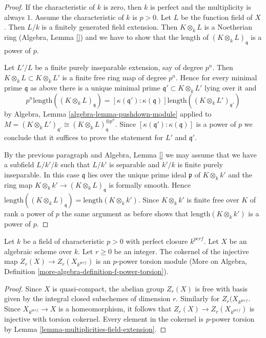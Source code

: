 \begin{proof}
If the characteristic of $k$ is zero, then $k$ is perfect and
the multiplicity is always $1$. Assume the characteristic of $k$ is $p > 0$.
Let $L$ be the function field of $X$. Then $L/k$ is a finitely generated
field extension. Then $K \otimes_k L$ is a Noetherian ring
(Algebra, Lemma \ref{}) and we
have to show that the length of $(K \otimes_k L)_\mathfrak q$
is a power of $p$.

\medskip\noindent
Let $L'/L$ be a finite purely inseparable extension, say of degree
$p^n$. Then $K \otimes_k L \subset K \otimes_k L'$ is a finite
free ring map of degree $p^n$. Hence for every minimal
prime $\mathfrak q$ as above there is a unique minimal prime
$\mathfrak q' \subset K \otimes_k L'$ lying over it and
$$
p^n \text{length}((K \otimes_k L)_\mathfrak q) =
[\kappa(\mathfrak q') : \kappa(\mathfrak q)]
\text{length}((K \otimes_k L')_{\mathfrak q'})
$$
by Algebra, Lemma \ref{algebra-lemma-pushdown-module} applied
to $M = (K \otimes_k L')_{\mathfrak q'} \cong
(K \otimes_k L)_{\mathfrak q}^{\oplus p^n}$.
Since $[\kappa(\mathfrak q') : \kappa(\mathfrak q)]$ is a power
of $p$ we conclude that it suffices to prove the
statement for $L'$ and $\mathfrak q'$.

\medskip\noindent
By the previous paragraph and Algebra, Lemma \ref{}
we may assume that we have a subfield $L/k'/k$
such that $L/k'$ is separable and $k'/k$ is finite
purely inseparable. In this case $\mathfrak q$ lies
over the unique prime ideal $\mathfrak p$ of $K \otimes_k k'$
and the ring map $K \otimes_k k' \to (K \otimes_k L)_\mathfrak q$
is formally smooth. Hence
$\text{length}((K \otimes_k L)_\mathfrak q) =
\text{length}(K \otimes_k k')$.
Since $K \otimes_k k'$ is finite free over $K$ of
rank a power of $p$ the same argument as before shows
that $\text{length}(K \otimes_k k')$ is a power of $p$.
\end{proof}

\begin{lemma}
\label{lemma-how-different}
Let $k$ be a field of characteristic $p > 0$ with perfect closure $k^{perf}$.
Let $X$ be an algebraic scheme over $k$. Let $r \geq 0$ be an integer.
The cokernel of the injective map $Z_r(X) \to Z_r(X_{k^{perf}})$ is an
$p$-power torsion module (More on Algebra, Definition
\ref{more-algebra-definition-f-power-torsion}).
\end{lemma}

\begin{proof}
Since $X$ is quasi-compact, the abelian group $Z_r(X)$ is free with basis
given by the integral closed subschemes of dimension $r$. Similarly for
$Z_r(X_{k^{perf}}$.
Since $X_{k^{perf}} \to X$ is a homeomorphism, it follows
that $Z_r(X) \to Z_r(X_{k^{perf}})$ is injective with torsion cokernel.
Every element in the cokernel is $p$-power torsion by
Lemma \ref{lemma-multiplicities-field-extension}.
\end{proof}





